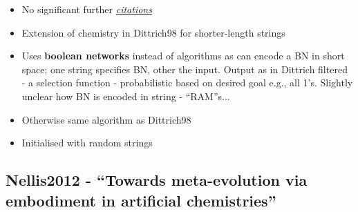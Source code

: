 		\begin{itemize}
			\item
			
			No significant further
			\href{https://scholar.google.com/scholar?cites=6514200166149032694\&as_sdt=2005\&sciodt=0,5\&hl=en}{\emph{citations}}
			
			\item
			
			Extension of chemistry in Dittrich98 for shorter-length strings
			
			\item
			
			Uses \textbf{boolean networks} instead of algorithms as can encode a
			BN in short space; one string specifies BN, other the input. Output as
			in Dittrich filtered - a selection function - probabilistic based on
			desired goal e.g., all 1's. Slightly unclear how BN is encoded in
			string - ``RAM''s...
			
			\item
			
			Otherwise same algorithm as Dittrich98
			
			\item
			
			Initialised with random strings
			
		\end{itemize}
		
		\hypertarget{nellis2012---towards-meta-evolution-via-embodiment-in-artificial-chemistries}{\subsection{Nellis2012
				- ``Towards meta-evolution via embodiment in artificial
				chemistries''}\label{nellis2012---towards-meta-evolution-via-embodiment-in-artificial-chemistries}}
		
